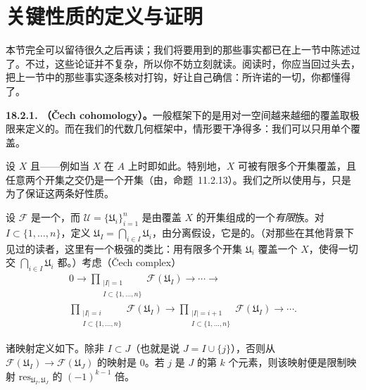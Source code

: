 
\section{关键性质的定义与证明}

本节完全可以留待很久之后再读；我们将要用到的那些事实都已在上一节中陈述过了。不过，这些论证并不复杂，所以你不妨立刻就读。阅读时，你应当回过头去，把上一节中的那些事实逐条核对打钩，好让自己确信：所许诺的一切，你都懂得了。

\textbf{18.2.1. \trCechCohomology{}（Čech cohomology）。}\quad 一般框架下的\trCechCohomology{}是用对一空间越来越细的覆盖取极限来定义的。而在我们的代数几何框架中，情形要干净得多：我们可以只用单个覆盖。

设 $X$ \trQuasicompact{}且\trSeparated——例如当 $X$ 在 $A$ 上\trQuasiprojective{}时即如此。特别地，$X$ 可被有限多个\trAffine{}开集覆盖，且任意两个\trAffine{}开集之交仍是一个\trAffine{}开集（由\trSeparatedness，\mbox{命题~11.2.13}）。我们之所以使用\trQuasicompactness{}与\trSeparatedness，只是为了保证这两条好性质。

设 $\mathscr{F}$ 是一个\trQCSheaf，而 $\mathscr{U}=\{\mathfrak{U}_i\}_{i=1}^{n}$ 是由覆盖 $X$ 的\trAffine{}开集组成的一个\emph{有限}族。对 $I\subset\{1,\dots,n\}$，定义 $\mathfrak{U}_I=\bigcap_{i\in I}\mathfrak{U}_i$，由分离假设，它是\trAffine{}的。（对那些在其他背景下见过\trCohomology{}的读者，这里有一个极强的类比：用有限多个开集 $\mathfrak{U}_i$ 覆盖一个\trTopologicalSpace{} $X$，使得一切交 $\bigcap_{i\in I}\mathfrak{U}_i$ 都\trContractible。）考虑\textbf{\trCech\trComplexN}（Čech complex）
\begin{equation*}\tag{18.2.1.1}\label{eq:cech-complex}
\begin{aligned}
0\longrightarrow\prod_{\substack{|I|=1\\ I\subset\{1,\dots,n\}}}\mathscr{F}(\mathfrak{U}_I)\longrightarrow\cdots\longrightarrow{}\\
\prod_{\substack{|I|=i\\ I\subset\{1,\dots,n\}}}\mathscr{F}(\mathfrak{U}_I)\longrightarrow\prod_{\substack{|I|=i+1\\ I\subset\{1,\dots,n\}}}\mathscr{F}(\mathfrak{U}_I)\longrightarrow\cdots.
\end{aligned}
\end{equation*}

诸映射定义如下。除非 $I\subset J$（也就是说 $J=I\cup\{j\}$），否则从 $\mathscr{F}(\mathfrak{U}_I)\to\mathscr{F}(\mathfrak{U}_J)$ 的映射是 $0$。若 $j$ 是 $J$ 的第 $k$ 个元素，则该映射便是限制映射 $\mathrm{res}_{\mathfrak{U}_I,\mathfrak{U}_J}$ 的 $(-1)^{k-1}$ 倍。

